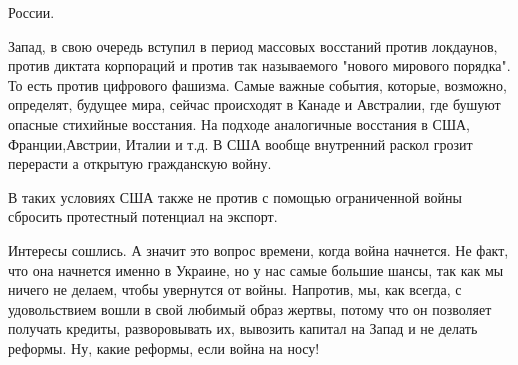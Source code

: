 России.

Запад, в свою очередь вступил в период массовых восстаний против локдаунов,
против диктата корпораций и против так называемого "нового мирового порядка".
То есть против цифрового фашизма. Самые важные события, которые, возможно,
определят, будущее мира, сейчас происходят в Канаде и Австралии, где бушуют
опасные стихийные восстания. На подходе аналогичные восстания в США,
Франции,Австрии, Италии и т.д. В США  вообще внутренний раскол грозит перерасти
а открытую гражданскую войну.

В таких условиях США также не против с помощью ограниченной войны сбросить
протестный потенциал на экспорт.

Интересы сошлись. А значит это вопрос времени, когда война начнется. Не  факт,
что она начнется  именно в Украине, но  у нас самые большие шансы, так как мы
ничего не делаем, чтобы увернутся от войны. Напротив, мы, как всегда, с
удовольствием вошли в свой любимый образ жертвы, потому что он позволяет
получать кредиты, разворовывать их, вывозить капитал на Запад  и не делать
реформы. Ну, какие реформы, если война на носу!
